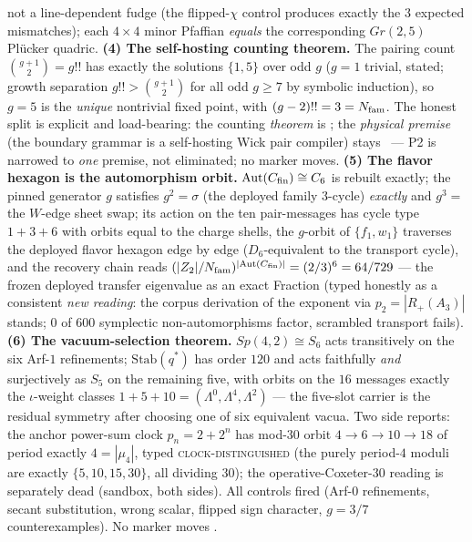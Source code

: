\begin{keybox}
not a line-dependent fudge (the flipped-$\chi$ control produces
exactly the $3$ expected mismatches); each $4\times4$ minor
Pfaffian \emph{equals} the corresponding $Gr(2,5)$ Pl\"ucker
quadric.  \textbf{(4) The self-hosting counting theorem.}  The
pairing count $\binom{g+1}{2} = g!!$ has exactly the solutions
$\{1, 5\}$ over odd $g$ ($g = 1$ trivial, stated; growth
separation $g!! > \binom{g+1}{2}$ for all odd $g \ge 7$ by
symbolic induction), so $g = 5$ is the \emph{unique} nontrivial
fixed point, with $(g-2)!! = 3 = N_{\mathrm{fam}}$.  The honest split is
explicit and load-bearing: the counting \emph{theorem} is \mE;
the \emph{physical premise} (the boundary grammar is a
self-hosting Wick pair compiler) stays \mO\ --- P2 is narrowed
to \emph{one} premise, not eliminated; no marker moves.
\textbf{(5) The flavor hexagon is the automorphism orbit.}
$\mathrm{Aut}(C_{\rm fin}) \cong C_6$ is rebuilt exactly; the
pinned generator $g$ satisfies $g^2 = \sigma$ (the deployed
family $3$-cycle) \emph{exactly} and $g^3 =$ the $W$-edge sheet
swap; its action on the ten pair-messages has cycle type $1 + 3
+ 6$ with orbits equal to the charge shells, the $g$-orbit of
$\{f_1, w_1\}$ traverses the deployed flavor hexagon edge by
edge ($D_6$-equivalent to the transport cycle), and the
recovery chain reads $(|Z_2|/N_{\mathrm{fam}})^{|\mathrm{Aut}(C_{\rm
fin})|} = (2/3)^6 = 64/729$ --- the frozen deployed transfer
eigenvalue as an exact Fraction (typed honestly as a consistent
\emph{new reading}: the corpus derivation of the exponent via
$p_2 = |R_+(A_3)|$ stands; $0$ of $600$ symplectic
non-automorphisms factor, scrambled transport fails).
\textbf{(6) The vacuum-selection theorem.}  $Sp(4,2) \cong S_6$
acts transitively on the six Arf-$1$ refinements;
$\mathrm{Stab}(q^{*})$ has order $120$ and acts faithfully
\emph{and} surjectively as $S_5$ on the remaining five, with
orbits on the $16$ messages exactly the $\iota$-weight classes
$1 + 5 + 10 = (\Lambda^0, \Lambda^4, \Lambda^2)$ --- the
five-slot carrier is the residual symmetry after choosing one
of six equivalent vacua.  Two side reports: the anchor
power-sum clock $p_n = 2 + 2^n$ has mod-$30$ orbit $4 \to 6 \to
10 \to 18$ of period exactly $4 = |\mu_4|$, typed
\textsc{clock-distinguished} (the purely period-$4$ moduli are
exactly $\{5, 10, 15, 30\}$, all dividing $30$); the
operative-Coxeter-$30$ reading is separately dead (sandbox,
both sides).  All controls fired (Arf-$0$ refinements, secant
substitution, wrong scalar, flipped sign character, $g = 3/7$
counterexamples).  No marker moves \mE.
\end{keybox}

